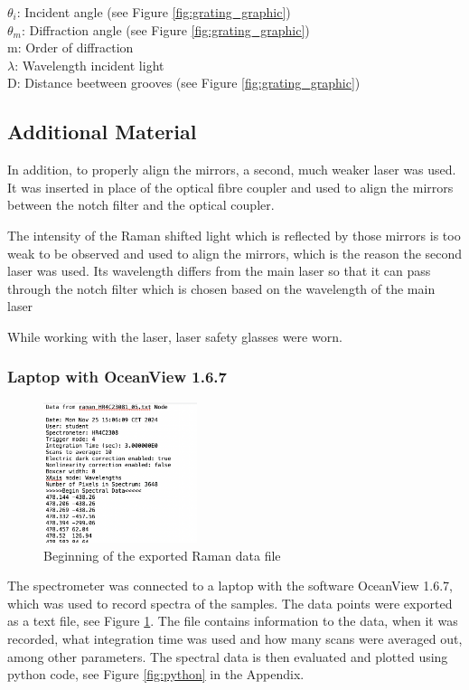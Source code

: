 \(\theta_i\): Incident angle (see Figure \ref{fig:grating_graphic})\\
\(\theta_m\): Diffraction angle (see Figure \ref{fig:grating_graphic})\\
m: Order of diffraction\\
\(\lambda\): Wavelength incident light\\
D: Distance beetween grooves (see Figure \ref{fig:grating_graphic})


\subsection{Additional Material}

In addition, to properly align the mirrors, a second, much weaker laser was used. It was inserted in place of the optical fibre coupler and used to align the mirrors between the notch filter and the optical coupler. 

\bigskip

The intensity of the Raman shifted light which is reflected by those mirrors is too weak to be observed and used to align the mirrors, which is the reason the second laser was used. Its wavelength differs from the main laser so that it can pass through the notch filter which is chosen based on the wavelength of the main laser
\bigskip

While working with the laser, laser safety glasses were worn. 

\subsubsection{Laptop with OceanView 1.6.7}

\begin{figure}
    \vspace{-20pt}
    \centering
    \includegraphics[width=0.4\textwidth]{images/data_raman.png}
    \vspace{-30pt}
    \caption{Beginning of the exported Raman data file}
    \label{fig:raman_txt}
    \vspace{-10pt}
\end{figure}
The spectrometer was connected to a laptop with the software OceanView 1.6.7, which was used to record spectra of the samples. The data points were exported as a text file, see Figure \ref{fig:raman_txt}. The file contains information to the data, when it was recorded, what integration time was used and how many scans were averaged out, among other parameters. The spectral data is then evaluated and plotted using python code, see Figure \ref{fig:python} in the Appendix.

\bigskip


